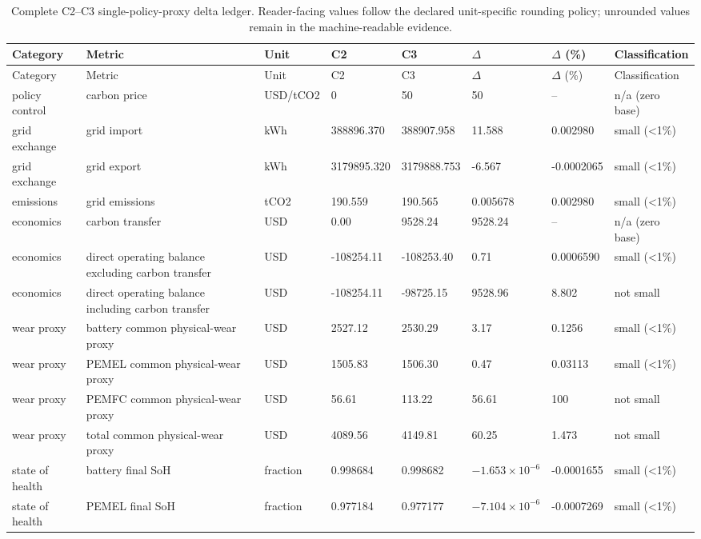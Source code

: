 \begin{longtable}{p{}p{}p{}p{}p{}p{}p{}p{}}
\caption{Complete C2--C3 single-policy-proxy delta ledger. Reader-facing values follow the declared unit-specific rounding policy; unrounded values remain in the machine-readable evidence.}\label{tab:s-carbon}\\
\toprule
Category & Metric & Unit & C2 & C3 & $\Delta$ & $\Delta$ (\%) & Classification\\
\midrule
\endfirsthead
\toprule
Category & Metric & Unit & C2 & C3 & $\Delta$ & $\Delta$ (\%) & Classification\\
\midrule
\endhead
policy control & carbon price & USD/tCO2 & 0 & 50 & 50 & -- & n/a (zero base) \\
grid exchange & grid import & kWh & 388896.370 & 388907.958 & 11.588 & 0.002980 & small (<1\%) \\
grid exchange & grid export & kWh & 3179895.320 & 3179888.753 & -6.567 & -0.0002065 & small (<1\%) \\
emissions & grid emissions & tCO2 & 190.559 & 190.565 & 0.005678 & 0.002980 & small (<1\%) \\
economics & carbon transfer & USD & 0.00 & 9528.24 & 9528.24 & -- & n/a (zero base) \\
economics & direct operating balance excluding carbon transfer & USD & -108254.11 & -108253.40 & 0.71 & 0.0006590 & small (<1\%) \\
economics & direct operating balance including carbon transfer & USD & -108254.11 & -98725.15 & 9528.96 & 8.802 & not small \\
wear proxy & battery common physical-wear proxy & USD & 2527.12 & 2530.29 & 3.17 & 0.1256 & small (<1\%) \\
wear proxy & PEMEL common physical-wear proxy & USD & 1505.83 & 1506.30 & 0.47 & 0.03113 & small (<1\%) \\
wear proxy & PEMFC common physical-wear proxy & USD & 56.61 & 113.22 & 56.61 & 100 & not small \\
wear proxy & total common physical-wear proxy & USD & 4089.56 & 4149.81 & 60.25 & 1.473 & not small \\
state of health & battery final SoH & fraction & 0.998684 & 0.998682 & $-1.653\times10^{-6}$ & -0.0001655 & small (<1\%) \\
state of health & PEMEL final SoH & fraction & 0.977184 & 0.977177 & $-7.104\times10^{-6}$ & -0.0007269 & small (<1\%) \\

\end{longtable}
